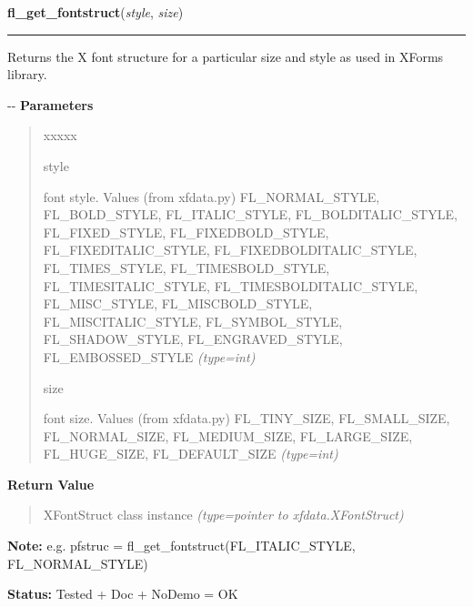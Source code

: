     \label{xformslib:flxbasic:fl_get_fontstruct}

    \vspace{0.5ex}

\hspace{.8\funcindent}\begin{boxedminipage}{\funcwidth}

    \raggedright \textbf{fl\_get\_fontstruct}(\textit{style}, \textit{size})

    \vspace{-1.5ex}

    \rule{\textwidth}{0.5\fboxrule}
\setlength{\parskip}{2ex}

Returns the X font structure for a particular size and style as used
in XForms library.

-{}-
\setlength{\parskip}{1ex}
      \textbf{Parameters}
      \vspace{-1ex}

      \begin{quote}
        \begin{Ventry}{xxxxx}

          \item[style]


font style. Values (from xfdata.py) FL\_NORMAL\_STYLE, FL\_BOLD\_STYLE,
FL\_ITALIC\_STYLE, FL\_BOLDITALIC\_STYLE, FL\_FIXED\_STYLE,
FL\_FIXEDBOLD\_STYLE, FL\_FIXEDITALIC\_STYLE, FL\_FIXEDBOLDITALIC\_STYLE,
FL\_TIMES\_STYLE, FL\_TIMESBOLD\_STYLE, FL\_TIMESITALIC\_STYLE,
FL\_TIMESBOLDITALIC\_STYLE, FL\_MISC\_STYLE, FL\_MISCBOLD\_STYLE,
FL\_MISCITALIC\_STYLE, FL\_SYMBOL\_STYLE, FL\_SHADOW\_STYLE,
FL\_ENGRAVED\_STYLE, FL\_EMBOSSED\_STYLE
            {\it (type=int)}

          \item[size]


font size. Values (from xfdata.py) FL\_TINY\_SIZE, FL\_SMALL\_SIZE,
FL\_NORMAL\_SIZE, FL\_MEDIUM\_SIZE, FL\_LARGE\_SIZE, FL\_HUGE\_SIZE,
FL\_DEFAULT\_SIZE
            {\it (type=int)}

        \end{Ventry}

      \end{quote}

      \textbf{Return Value}
    \vspace{-1ex}

      \begin{quote}

XFontStruct class instance
      {\it (type=pointer to xfdata.XFontStruct)}

      \end{quote}

\textbf{Note:} 
e.g. pfstruc = fl\_get\_fontstruct(FL\_ITALIC\_STYLE, FL\_NORMAL\_STYLE)


\textbf{Status:} 
Tested + Doc + NoDemo = OK


    \end{boxedminipage}

